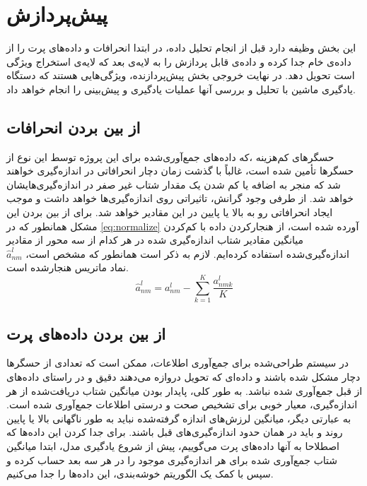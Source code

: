 \section{پیش‌پردازش}
این بخش وظیفه دارد قبل از انجام تحلیل داده، در ابتدا انحرافات و داده‌های پرت را از داده‌ی خام جدا کرده و داده‌ی قابل پردازش را به لایه‌ی بعد که لایه‌ی استخراج ویژگی‌ است تحویل دهد. در نهایت خروجی بخش پیش‌پردازنده، ویژگی‌هایی هستند که دستگاه یادگیری ماشین با تحلیل و بررسی آنها عملیات یادگیری و پیش‌بینی را انجام خواهد داد.

\subsection{از بین بردن انحرافات}
 حسگرهای کم‌هزینه  ،که داده‌های جمع‌آوری‌شده برای این پروژه توسط این نوع از حسگرها تأمین شده است، غالباً با گذشت زمان دچار انحرافاتی در اندازه‌گیری خواهند شد که منجر به اضافه یا کم شدن یک مقدار شتاب غیر صفر در اندازه‌گیری‌هایشان خواهد شد. از طرفی وجود گرانش، تاثیراتی روی اندازه‌گیری‌ها خواهد داشت و موجب ایجاد انحرافاتی رو به بالا یا پایین در این مقادیر خواهد شد\cite{jung2017vibration}. برای از بین بردن این مشکل همانطور که در \cref{eq:normalize} آورده شده است\cite{garcia2015data}، از هنجار‌کردن داده با کم‌کردن میانگین مقادیر شتاب اندازه‌گیری شده در هر کدام از سه محور از مقادیر اندازه‌گیری‌شده استفاده کرده‌ایم. لازم به ذکر است همانطور که مشخص است، $\hat{a}^l_{nm}$ نماد ماتریس هنجار‌شده است.
\begin{equation}
\label{eq:normalize}
	\hat{a}^l_{nm}=a^l_{nm}-\sum_{k=1}^K \dfrac{a^l_{nmk}}{K}
\end{equation}


\subsection{از بین بردن داده‌های پرت}
در سیستم طراحی‌شده برای جمع‌آوری اطلاعات، ممکن است که تعدادی از حسگرها دچار مشکل شده باشند و داده‌ای که تحویل دروازه می‌دهند دقیق و در راستای داده‌های از قبل جمع‌آوری شده نباشد. به طور کلی، پایدار بودن میانگین شتاب دریافت‌شده از هر اندازه‌گیری، معیار خوبی برای تشخیص صحت و درستی اطلاعات جمع‌‌آوری شده است\cite{jung2017vibration}. به عبارتی دیگر، میانگین لرزش‌های اندازه گرفته‌شده نباید به طور ناگهانی بالا یا پایین روند و باید در همان حدود اندازه‌گیری‌های قبل باشند. برای جدا کردن این داده‌ها که اصطلاحا به آنها داده‌های پرت می‌گوییم، پیش از شروع یادگیری مدل، ابتدا میانگین شتاب جمع‌‌آوری ‌شده برای هر اندازه‌گیری موجود را در هر سه بعد حساب کرده و سپس با کمک یک الگوریتم خوشه‌بندی، این داده‌ها را جدا می‌کنیم.

